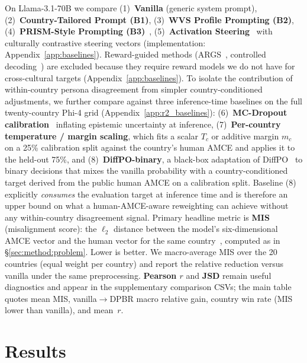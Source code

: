 \documentclass{article}
\begin{document}
On Llama-3.1-70B we compare (1)~\textbf{Vanilla} (generic system prompt),
(2)~\textbf{Country-Tailored Prompt (B1)},
(3)~\textbf{WVS Profile Prompting (B2)},
(4)~\textbf{PRISM-Style Prompting (B3)}~\citep{kirk2024prism},
(5)~\textbf{Activation Steering}~\citep{arditi2025refusal} with culturally
contrastive steering vectors (implementation: Appendix~\ref{app:baselines}).
Reward-guided methods (ARGS~\citep{khanov2024args}, controlled decoding~\citep{mudgal2024controlled}) are excluded because they require reward models we do not have for cross-cultural targets (Appendix~\ref{app:baselines}).
To isolate the contribution of within-country persona disagreement
from simpler country-conditioned adjustments, we further compare against
three inference-time baselines on the full twenty-country Phi-4 grid
(Appendix~\ref{app:r2_baselines}):
(6)~\textbf{MC-Dropout calibration}~\citep{gal2016dropout, kwon2025dropouts}
inflating epistemic uncertainty at inference,
(7)~\textbf{Per-country temperature / margin scaling}, which fits a scalar
$T_c$ or additive margin $m_c$ on a 25\% calibration split against the
country's human AMCE and applies it to the held-out 75\%, and
(8)~\textbf{DiffPO-binary}, a black-box adaptation of
DiffPO~\citep{chen2025diffpo} to binary decisions that mixes the vanilla
probability with a country-conditioned target derived from the public human
AMCE on a calibration split. Baseline (8) explicitly \emph{consumes} the
evaluation target at inference time and is therefore an upper bound on what
a human-AMCE-aware reweighting can achieve without any within-country
disagreement signal.
Primary headline metric is \textbf{MIS} (misalignment score): the $\ell_2$ distance
between the model's six-dimensional AMCE vector and the human vector for the same
country~\citep{jin2025multitp}, computed as in \S\ref{sec:method:problem}. Lower is better. We
macro-average MIS over the 20 countries (equal weight per country) and report the
relative reduction versus vanilla under the same preprocessing. \textbf{Pearson
$r$} and \textbf{JSD} remain useful diagnostics and appear in the supplementary
comparison CSVs; the main table quotes mean MIS, vanilla$\to$DPBR macro relative
gain, country win rate (MIS lower than vanilla), and mean~$r$.

\section{Results}
\label{sec:results}
\end{document}
